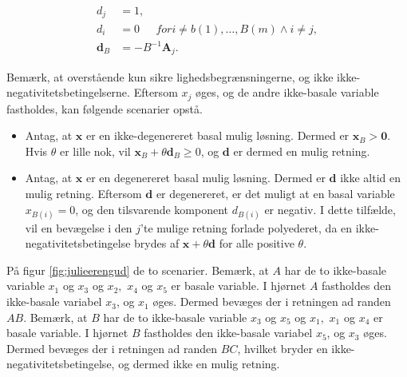{\begin{defn}{}{}
%
\begin{align*}
d_j & = 1, \\
d_i & = 0 \phantom{hej} for i \neq b(1), \ldots , B(m) \wedge i \neq j, \\
\mathbf{d}_B & = - B^{-1} \mathbf{A}_j.
\end{align*}
% 
\end{defn}
\noindent
%
Bemærk, at overstående kun sikre lighedsbegrænsningerne, og ikke ikke-negativitetsbetingelserne. 
Eftersom $x_j$ øges, og de andre ikke-basale variable fastholdes, kan følgende scenarier opstå. 
\begin{itemize}
\item Antag, at $\mathbf{x}$ er en ikke-degenereret basal mulig løsning. 
Dermed er $\mathbf{x}_B > \mathbf{0}$. 
Hvis $\theta$ er lille nok, vil $\mathbf{x}_B + \theta \mathbf{d}_B \geq 0 $, og $\mathbf{d}$ er dermed en mulig retning. 
\item Antag, at $\mathbf{x}$ er en degenereret basal mulig løsning. 
Dermed er $\mathbf{d}$ ikke altid en mulig retning. 
Eftersom $\mathbf{d}$ er degenereret, er det muligt at en basal variable $x_{B(i)}=0$, og den tilsvarende komponent $d_{B(i)}$ er negativ. 
I dette tilfælde, vil en bevægelse i den $j$'te mulige retning forlade polyederet, da en ikke-negativitetsbetingelse brydes af $\mathbf{x} + \theta \mathbf{d}$ for alle positive $\theta$. 
\end{itemize}
%
På figur \ref{fig:julieerengud} de to scenarier. 
Bemærk, at $A$ har de to ikke-basale variable $x_1$ og $x_3$ og $x_2,$ $x_4$ og $x_5$ er basale variable.
I hjørnet $A$ fastholdes den ikke-basale variabel $x_3$, og $x_1$ øges. 
Dermed bevæges der i retningen ad randen $AB$. 
Bemærk, at $B$ har de to ikke-basale variable $x_3$ og $x_5$ og $x_1,$ $x_1$ og $x_4$ er basale variable.
I hjørnet $B$ fastholdes den ikke-basale variabel $x_5$, og $x_3$ øges. 
Dermed bevæges der i retningen ad randen $BC$, hvilket bryder en ikke-negativitetsbetingelse, og dermed ikke en mulig retning. 
}
%
